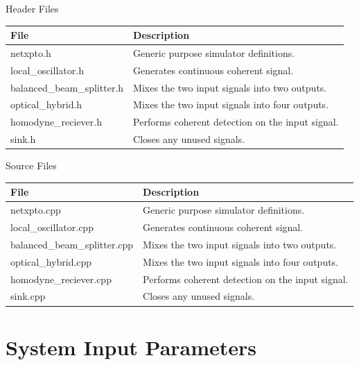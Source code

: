 Header Files
\begin{table}[H]
\centering
\begin{tabulary}{1.0\textwidth}{|L|L|}
\hline
\textbf{File}              & \textbf{Description} 				            \\ \hline
netxpto.h                  & Generic purpose simulator definitions.	        \\ \hline
local\_oscillator.h        & Generates continuous coherent signal.            \\ \hline
balanced\_beam\_splitter.h & Mixes the two input signals into two outputs.    \\ \hline
optical\_hybrid.h          & Mixes the two input signals into four outputs.   \\ \hline
homodyne\_reciever.h       & Performs coherent detection on the input signal. \\ \hline
sink.h                     & Closes any unused signals.                       \\ \hline
\end{tabulary}
\end{table}
%
Source Files
\begin{table}[H]
\centering
\begin{tabulary}{1.0\textwidth}{|L|L|}
\hline
\textbf{File}                & \textbf{Description} 					          \\ \hline
netxpto.cpp                  & Generic purpose simulator definitions.	          \\ \hline
local\_oscillator.cpp        & Generates continuous coherent signal.            \\ \hline
balanced\_beam\_splitter.cpp & Mixes the two input signals into two outputs.    \\ \hline
optical\_hybrid.cpp          & Mixes the two input signals into four outputs.   \\ \hline
homodyne\_reciever.cpp       & Performs coherent detection on the input signal. \\ \hline
sink.cpp                     & Closes any unused signals.                       \\ \hline
\end{tabulary}
\end{table}


\section{System Input Parameters}

